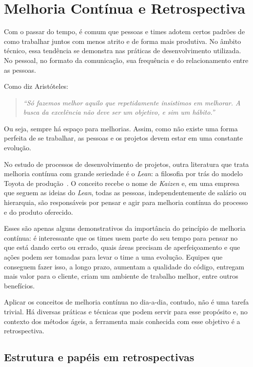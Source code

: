 \section{Melhoria Contínua e Retrospectiva}

Com o passar do tempo, é comum que pessoas e times adotem certos padrões de como trabalhar juntos com menos atrito e de forma mais produtiva. No âmbito técnico, essa tendência se demonstra nas práticas de desenvolvimento utilizada. No pessoal, no formato da comunicação, sua frequência e do relacionamento entre as pessoas.

Como diz Aristóteles: 

\begin{quote}
\textit{``Só fazemos melhor aquilo que repetidamente insistimos em melhorar. A busca da excelência não deve ser um objetivo, e sim um hábito.''}
\end{quote}

Ou seja, sempre há espaço para melhorias. Assim, como não existe uma forma perfeita de se trabalhar, as pessoas e os projetos devem estar em uma constante evolução.

No estudo de processos de desenvolvimento de projetos, outra literatura que trata melhoria contínua com grande seriedade é o \textit{Lean}: a filosofia por trás do modelo Toyota de produção~\cite{lean}. O conceito recebe o nome de \textit{Kaizen} e, em uma empresa que seguem as ideias do \textit{Lean}, todas as pessoas, independentemente de salário ou hierarquia, são responsáveis por pensar e agir para melhoria contínua do processo e do produto oferecido.

Esses são apenas alguns demonstrativos da importância do princípio de melhoria contínua: é interessante que os times usem parte do seu tempo para pensar no que está dando certo ou errado, quais áreas precisam de aperfeiçoamento e que ações podem ser tomadas para levar o time a uma evolução. Equipes que conseguem fazer isso, a longo prazo, aumentam a qualidade do código, entregam mais valor para o cliente, criam um ambiente de trabalho melhor, entre outros benefícios.

Aplicar os conceitos de melhoria contínua no dia-a-dia, contudo, não é uma tarefa trivial. Há diversas práticas e técnicas que podem servir para esse propósito e, no contexto dos métodos ágeis, a ferramenta mais conhecida com esse objetivo é a retrospectiva.

\subsection{Estrutura e papéis em retrospectivas}

